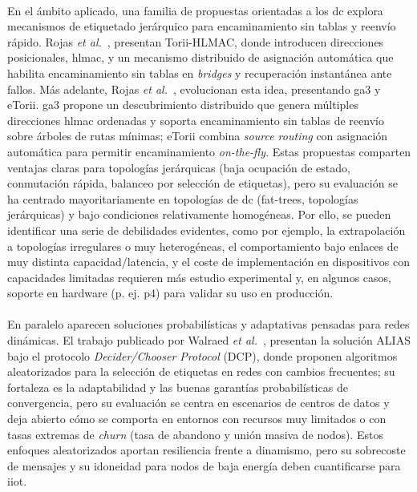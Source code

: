 \\
En el ámbito aplicado, una familia de propuestas orientadas a los \gls{dc} explora mecanismos de etiquetado jerárquico para encaminamiento sin tablas y reenvío rápido. Rojas \textit{et al.}~\cite{rojas2012torii}, presentan Torii-HLMAC, donde introducen direcciones posicionales, \gls{hlmac}, y un mecanismo distribuido de asignación automática que habilita encaminamiento sin tablas en \textit{bridges} y recuperación instantánea ante fallos. Más adelante, Rojas \textit{et al.}~\cite{rojas2017ga3,rojas2021scalable}, evolucionan esta idea, presentando \gls{ga3} y eTorii. \gls{ga3} propone un descubrimiento distribuido que genera múltiples direcciones \gls{hlmac} ordenadas y soporta encaminamiento sin tablas de reenvío sobre árboles de rutas mínimas; eTorii combina \textit{source routing} con asignación automática para permitir encaminamiento \textit{on-the-fly}. Estas propuestas comparten ventajas claras para topologías jerárquicas (baja ocupación de estado, conmutación rápida, balanceo por selección de etiquetas), pero su evaluación se ha centrado mayoritariamente en topologías de \gls{dc} (fat-trees, topologías jerárquicas) y bajo condiciones relativamente homogéneas. Por ello, se pueden identificar una serie de debilidades evidentes, como por ejemplo, la extrapolación a topologías irregulares o muy heterogéneas, el comportamiento bajo enlaces de muy distinta capacidad/latencia, y el coste de implementación en dispositivos con capacidades limitadas requieren más estudio experimental y, en algunos casos, soporte en hardware (p. ej. \gls{p4}) para validar su uso en producción.\\
\\
En paralelo aparecen soluciones probabilísticas y adaptativas pensadas para redes dinámicas. El trabajo publicado por Walraed \textit{et al.}~\cite{walraed2013randomized}, presentan la solución ALIAS bajo el protocolo \textit{Decider/Chooser Protocol} (DCP), donde proponen algoritmos aleatorizados para la selección de etiquetas en redes con cambios frecuentes; su fortaleza es la adaptabilidad y las buenas garantías probabilísticas de convergencia, pero su evaluación se centra en escenarios de centros de datos y deja abierto cómo se comporta en entornos con recursos muy limitados o con tasas extremas de \textit{churn} (tasa de abandono y unión masiva de nodos). Estos enfoques aleatorizados aportan resiliencia frente a dinamismo, pero su sobrecoste de mensajes y su idoneidad para nodos de baja energía deben cuantificarse para \gls{iiot}.\\
